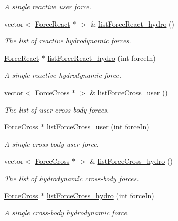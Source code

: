 \begin{DoxyCompactItemize}
\begin{DoxyCompactList}\small\item\em A single reactive user force. \end{DoxyCompactList}\item 
vector$<$ \hyperlink{class_force_react}{Force\-React} $\ast$ $>$ \& \hyperlink{class_body_ad68893d21ecf337242d68936132ad25a}{list\-Force\-React\-\_\-hydro} ()
\begin{DoxyCompactList}\small\item\em The list of reactive hydrodynamic forces. \end{DoxyCompactList}\item 
\hyperlink{class_force_react}{Force\-React} $\ast$ \hyperlink{class_body_a774fe4681465ee5a8ea344f4ec7c18e2}{list\-Force\-React\-\_\-hydro} (int force\-In)
\begin{DoxyCompactList}\small\item\em A single reactive hydrodynamic force. \end{DoxyCompactList}\item 
vector$<$ \hyperlink{class_force_cross}{Force\-Cross} $\ast$ $>$ \& \hyperlink{class_body_ac428c19730346a51bde800e0cbc2e281}{list\-Force\-Cross\-\_\-user} ()
\begin{DoxyCompactList}\small\item\em The list of user cross-\/body forces. \end{DoxyCompactList}\item 
\hyperlink{class_force_cross}{Force\-Cross} $\ast$ \hyperlink{class_body_af01cd5dc37ebd7969f4f2bc10ba3d76b}{list\-Force\-Cross\-\_\-user} (int force\-In)
\begin{DoxyCompactList}\small\item\em A single cross-\/body user force. \end{DoxyCompactList}\item 
vector$<$ \hyperlink{class_force_cross}{Force\-Cross} $\ast$ $>$ \& \hyperlink{class_body_a0dc70d3a67ad921a022f48a2fdf37526}{list\-Force\-Cross\-\_\-hydro} ()
\begin{DoxyCompactList}\small\item\em The list of hydrodynamic cross-\/body forces. \end{DoxyCompactList}\item 
\hyperlink{class_force_cross}{Force\-Cross} $\ast$ \hyperlink{class_body_ab814600b31abd49c0a8de29a0fb597b4}{list\-Force\-Cross\-\_\-hydro} (int force\-In)
\begin{DoxyCompactList}\small\item\em A single cross-\/body hydrodynamic force. \end{DoxyCompactList}\item 

\end{DoxyCompactItemize}
